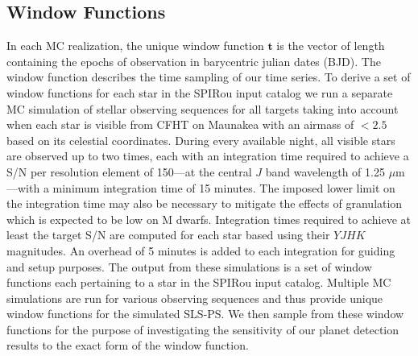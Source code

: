\subsection{Window Functions} \label{BSsect:wf}
In each MC realization, the unique window function $\mathbf{t}$ is the vector of length \nobs{} containing
the epochs of observation in barycentric julian dates (BJD). The window function describes the time sampling of
our time series. To derive a set of window functions for each star in the SPIRou input catalog
we run a separate MC simulation of stellar observing sequences for all targets taking into account
when each
star is visible from CFHT on Maunakea with an airmass of $<2.5$ based on its celestial coordinates.
During every available night, all visible stars are observed up to two times,
each with an integration time required to achieve a
S/N per resolution element of 150---at the central $J$ band wavelength of 1.25 $\mu$m---with a minimum integration
time of 15 minutes. The imposed lower limit on the
integration time may also be necessary to mitigate the effects of granulation \citep{lovis05} which is
expected to be low on M dwarfs. 
Integration times required to achieve at least the target S/N are computed for
each star based using their $YJHK$ magnitudes. An overhead of 5 minutes is added to each
integration for guiding and setup purposes.
The output from these simulations is a set of window functions each pertaining to a star in the
SPIRou input catalog. Multiple MC simulations are run for various observing
sequences and thus provide unique window functions for the simulated SLS-PS. We then sample from
these window functions for the purpose of investigating
the sensitivity of our planet detection results to the exact form of the window function. \\


